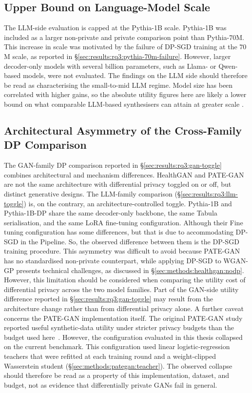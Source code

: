 \subsection{Upper Bound on Language-Model Scale}
\label{sec:discussion:limit:pythia-size}

The LLM-side evaluation is capped at the Pythia-1B scale. 
Pythia-1B was included as a larger non-private and private comparison
point than Pythia-70M. This increase in scale was motivated by the
failure of DP-SGD training at the $70$M scale, as reported in
\S\ref{sec:results:rq3:pythia-70m-failure}. However, larger decoder-only
models with several billion parameters, such as Llama- or Qwen-based
models, were not evaluated. The findings on
the LLM side should therefore be read as characterising the small-to-mid LLM
regime. Model size has been correlated with higher gains, so the
absolute utility figures here are likely a lower bound on what comparable
LLM-based synthesisers can attain at greater scale\cite{Miletic2024} .

\subsection{Architectural Asymmetry of the Cross-Family DP Comparison}
\label{sec:discussion:limit:gan-toggle-asymmetry}

The GAN-family DP comparison reported in
\S\ref{sec:results:rq3:gan-toggle} combines architectural and mechanism
differences. HealthGAN and PATE-GAN are not the same architecture with
differential privacy toggled on or off, but distinct generative designs.
The LLM-family comparison
(\S\ref{sec:results:rq3:llm-toggle}) is, on the contrary, an
architecture-controlled toggle. Pythia-1B and Pythia-1B-DP share the same
decoder-only backbone, the same Tabula serialisation, and the same LoRA
fine-tuning configuration. Although their Fine tuning configuration 
has some differences, but that is due to accommodating DP-SGD in the Pipeline.
So, the observed difference between them is
the DP-SGD training procedure. This asymmetry was difficult to avoid because PATE-GAN has no
standardised non-private counterpart, while applying DP-SGD to WGAN-GP
presents technical challenges, as discussed in
\S\ref{sec:methods:healthgan:nodp}. However, this limitation should be considered when comparing the utility
cost of differential privacy across the two model families. Part of the
GAN-side utility difference reported in
\S\ref{sec:results:rq3:gan-toggle} may result from the architecture change
rather than from differential privacy alone. A further caveat concerns the PATE-GAN
implementation itself. The original PATE-GAN study reported useful 
synthetic-data utility under
stricter privacy budgets than the budget used here~\cite{pategan}.
However, the configuration evaluated in this thesis collapsed on the
current benchmark. This configuration used linear logistic-regression
teachers that were refitted at each training round and a weight-clipped
Wasserstein student
(\S\ref{sec:methods:pategan:teacher}). The observed collapse should therefore be read
as a property of this implementation, dataset, and budget, not as evidence
that differentially private GANs fail in general.

